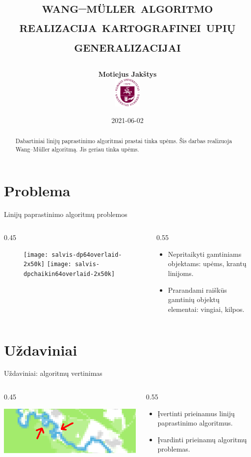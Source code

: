 \documentclass[14pt]{beamer}
\title{
    \Large\textsc{wang–müller algoritmo realizacija 
    kartografinei upių generalizacijai}

}
\author{\small \bf Motiejus Jakštys \\[4ex]
    \includegraphics[height=4em]{vu}
}
\date{\small 2021-06-02}
\newcommand{\WM}{Wang--M{\"u}ller}
\newcommand{\twocols}[2]
{
    \begin{columns}[c]
        \begin{column}{0.45\textwidth}
            #1
        \end{column}
        \begin{column}{0.55\textwidth}
            #2
        \end{column}
    \end{columns}
}
\begin{document}

\begin{frame}
\titlepage
\end{frame}

\begin{frame}
  \begin{abstract}

    Dabartiniai linijų paprastinimo algoritmai prastai tinka upėms. Šis darbas
    realizuoja {\WM} algoritmą. Jis geriau tinka upėms.

  \end{abstract}
\end{frame}

\section{Problema}

\begin{frame}{Linijų paprastinimo algoritmų problemos}
  \twocols{
    \begin{figure}[ht]
      \texttt{[image: salvis-dp64overlaid-2x50k]}
      \texttt{[image: salvis-dpchaikin64overlaid-2x50k]}
    \end{figure}
  }{
    \begin{itemize}[<+->]
      \item Nepritaikyti gamtiniams objektams: upėms, krantų linijoms.
      \item Prarandami raiškūs gamtinių objektų elementai: vingiai, kilpos.
    \end{itemize}
  }
\end{frame}

\section{Uždaviniai}

\begin{frame}{Uždaviniai: algoritmų vertinimas}
  \twocols{
    \includegraphics[width=\textwidth]{amalgamate1}
  }{
    \begin{itemize}
      \item Įvertinti prieinamus linijų paprastinimo algoritmus.
      \item Įvardinti prieinamų algoritmų problemas.
    \end{itemize}
  }
\end{frame}
\end{document}
